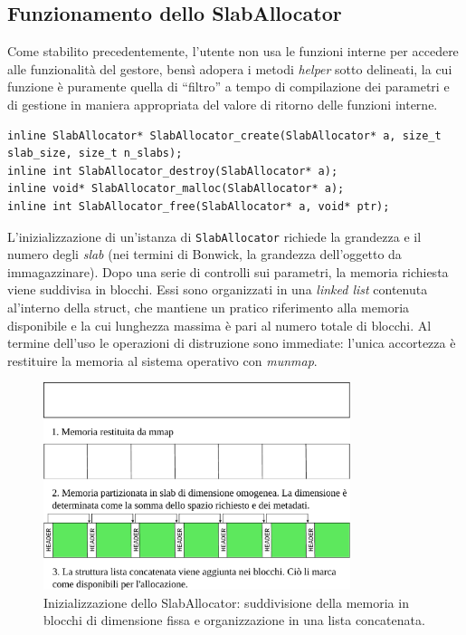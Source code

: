 \subsection*{Funzionamento dello SlabAllocator}
Come stabilito precedentemente, l’utente non usa le funzioni interne per accedere alle funzionalità del gestore, bensì adopera i metodi \textit{helper} sotto delineati, la cui funzione è puramente quella di “filtro” a tempo di compilazione dei parametri e di gestione in maniera appropriata del valore di ritorno delle funzioni interne. 

\begin{lstlisting}
inline SlabAllocator* SlabAllocator_create(SlabAllocator* a, size_t slab_size, size_t n_slabs);
inline int SlabAllocator_destroy(SlabAllocator* a);
inline void* SlabAllocator_malloc(SlabAllocator* a);
inline int SlabAllocator_free(SlabAllocator* a, void* ptr);
\end{lstlisting}

L’inizializzazione di un’istanza di \texttt{SlabAllocator} richiede la grandezza e il numero degli \textit{slab} (nei termini di Bonwick, la grandezza dell’oggetto da immagazzinare). Dopo una serie di controlli sui parametri, la memoria richiesta viene suddivisa in blocchi. Essi sono organizzati in una \textit{linked list} contenuta al'interno della struct, che mantiene un pratico riferimento alla memoria disponibile e la cui lunghezza massima è pari al numero totale di blocchi. Al termine dell’uso le operazioni di distruzione sono immediate: l’unica accortezza è restituire la memoria al sistema operativo con \textit{munmap}.

\begin{figure}[H]
    \centering
    \includegraphics[width=0.8\textwidth]{images/slab/slab_allocator_init.pdf}
    \caption{Inizializzazione dello SlabAllocator: suddivisione della memoria in blocchi di dimensione fissa e organizzazione in una lista concatenata.}
    \label{fig:slab_allocator_init}
\end{figure}

